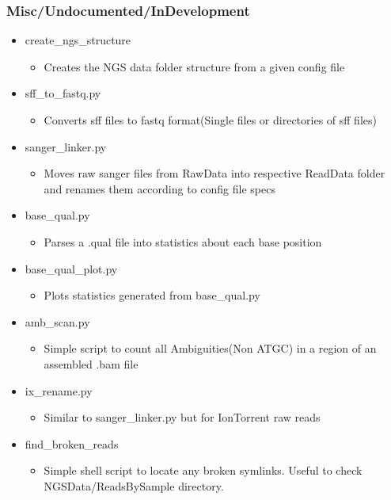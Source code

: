 \documentclass{article}
\begin{document}
\subsubsection{Misc/Undocumented/InDevelopment}
 \begin{itemize}
  \item create\_ngs\_structure
    \begin{itemize}
        \item Creates the NGS data folder structure from a given config file
    \end{itemize}
  \item sff\_to\_fastq.py
    \begin{itemize}
        \item Converts sff files to fastq format(Single files or directories of sff files)
    \end{itemize}
  \item sanger\_linker.py
    \begin{itemize}
        \item Moves raw sanger files from RawData into respective ReadData folder and renames them according to config file specs
    \end{itemize}
  \item base\_qual.py
    \begin{itemize}
        \item Parses a .qual file into statistics about each base position
    \end{itemize}
  \item base\_qual\_plot.py
    \begin{itemize}
        \item Plots statistics generated from base\_qual.py
    \end{itemize}
  \item amb\_scan.py
    \begin{itemize}
        \item Simple script to count all Ambiguities(Non ATGC) in a region of an assembled .bam file
    \end{itemize}
  \item ix\_rename.py
    \begin{itemize}
        \item Similar to sanger\_linker.py but for IonTorrent raw reads
    \end{itemize}
  \item find\_broken\_reads
    \begin{itemize}
        \item Simple shell script to locate any broken symlinks. Useful to check NGSData/ReadsBySample directory.

\end{itemize}
\end{itemize}
\end{document}
